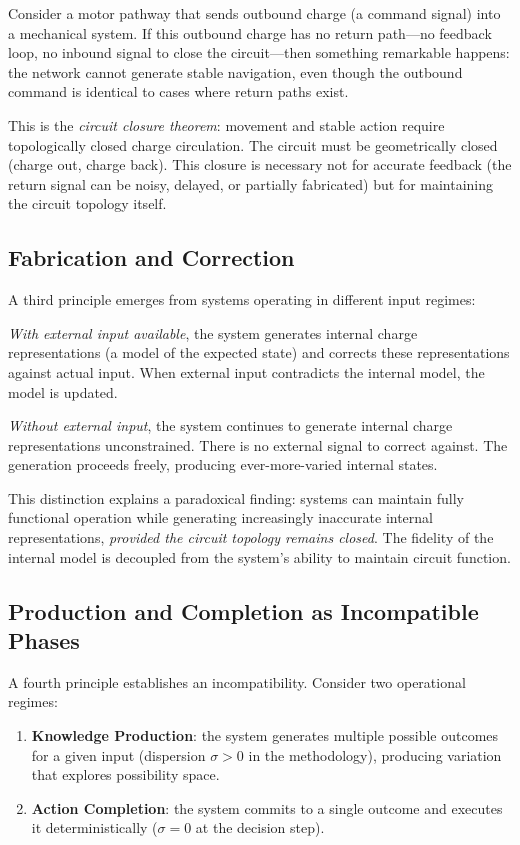 \documentclass[twocolumn,11pt,a4paper]{article}
\begin{document}
Consider a motor pathway that sends outbound charge (a command signal) into a mechanical system. If this outbound charge has no return path—no feedback loop, no inbound signal to close the circuit—then something remarkable happens: the network cannot generate stable navigation, even though the outbound command is identical to cases where return paths exist.

This is the \emph{circuit closure theorem}: movement and stable action require topologically closed charge circulation. The circuit must be geometrically closed (charge out, charge back). This closure is necessary not for accurate feedback (the return signal can be noisy, delayed, or partially fabricated) but for maintaining the circuit topology itself.

\subsection{Fabrication and Correction}

A third principle emerges from systems operating in different input regimes:

\emph{With external input available}, the system generates internal charge representations (a model of the expected state) and corrects these representations against actual input. When external input contradicts the internal model, the model is updated.

\emph{Without external input}, the system continues to generate internal charge representations unconstrained. There is no external signal to correct against. The generation proceeds freely, producing ever-more-varied internal states.

This distinction explains a paradoxical finding: systems can maintain fully functional operation while generating increasingly inaccurate internal representations, \emph{provided the circuit topology remains closed}. The fidelity of the internal model is decoupled from the system's ability to maintain circuit function.

\subsection{Production and Completion as Incompatible Phases}

A fourth principle establishes an incompatibility. Consider two operational regimes:

\begin{enumerate}[label=(\Roman*),leftmargin=*]
\item \textbf{Knowledge Production}: the system generates multiple possible outcomes for a given input (dispersion $\sigma>0$ in the methodology), producing variation that explores possibility space.

\item \textbf{Action Completion}: the system commits to a single outcome and executes it deterministically ($\sigma=0$ at the decision step).
\end{enumerate}
\end{document}
